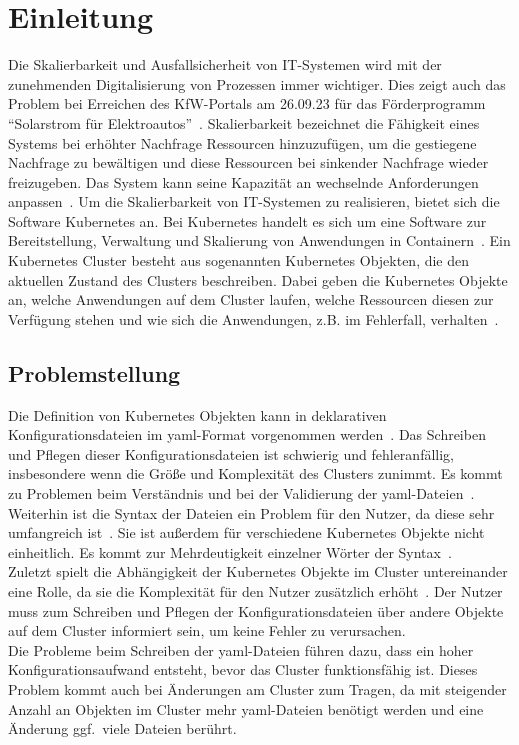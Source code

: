 \chapter{Einleitung}\label{ch:introduction}

Die Skalierbarkeit und Ausfallsicherheit von IT-Systemen wird mit der zunehmenden Digitalisierung von Prozessen immer wichtiger.
Dies zeigt auch das Problem bei Erreichen des KfW-Portals am 26.09.23 für das Förderprogramm ``Solarstrom für Elektroautos''~\cite{kfw-not-reachable}.
Skalierbarkeit bezeichnet die Fähigkeit eines Systems bei erhöhter Nachfrage Ressourcen hinzuzufügen, um die gestiegene Nachfrage zu bewältigen und
diese Ressourcen bei sinkender Nachfrage wieder freizugeben. Das System kann seine Kapazität an wechselnde Anforderungen anpassen~\cite{it-system-scaling}.
Um die Skalierbarkeit von IT-Systemen zu realisieren, bietet sich die Software Kubernetes an.
Bei Kubernetes handelt es sich um eine Software zur Bereitstellung, Verwaltung und Skalierung von Anwendungen in Containern~\cite{kubernetes-overview}.
Ein Kubernetes Cluster besteht aus sogenannten Kubernetes Objekten, die den aktuellen Zustand des Clusters beschreiben. Dabei geben die Kubernetes Objekte an,
welche Anwendungen auf dem Cluster laufen, welche Ressourcen diesen zur Verfügung stehen und wie sich die Anwendungen, z.B. im Fehlerfall, verhalten~\cite{kubernetes-objects}.

\section{Problemstellung}\label{sec:problem}

Die Definition von Kubernetes Objekten kann in deklarativen Konfigurationsdateien im \ac{yaml}-Format vorgenommen werden~\cite{kubernetes-config-declarative}.
Das Schreiben und Pflegen dieser Konfigurationsdateien ist schwierig und fehleranfällig,
insbesondere wenn die Größe und Komplexität des Clusters zunimmt.
Es kommt zu Problemen beim Verständnis und bei der Validierung der \ac{yaml}-Dateien~\cite{dev-to-kubernetes-challenges,kubetools-io-kubernetes-manifest-management}.
\\
Weiterhin ist die Syntax der Dateien ein Problem für den Nutzer, da diese sehr umfangreich ist~\cite{entwickler-de-kubernetes-problems}.
Sie ist außerdem für verschiedene Kubernetes Objekte nicht einheitlich.
Es kommt zur Mehrdeutigkeit einzelner Wörter der Syntax~\cite{dev-to-kubernetes-challenges}.
\\
Zuletzt spielt die Abhängigkeit der Kubernetes Objekte im Cluster untereinander eine Rolle,
da sie die Komplexität für den Nutzer zusätzlich erhöht~\cite{spacelift-io-kubernetes-challenges,newstack-io-kubernetes-manifest-lifecycle}.
Der Nutzer muss zum Schreiben und Pflegen der Konfigurationsdateien über andere Objekte auf dem Cluster informiert sein, um
keine Fehler zu verursachen.
\\
Die Probleme beim Schreiben der \ac{yaml}-Dateien führen dazu, dass ein hoher Konfigurationsaufwand entsteht, bevor das Cluster funktionsfähig ist.
Dieses Problem kommt auch bei Änderungen am Cluster zum Tragen, da mit steigender Anzahl an Objekten im Cluster mehr \ac{yaml}-Dateien
benötigt werden und eine Änderung ggf.\ viele Dateien berührt.

